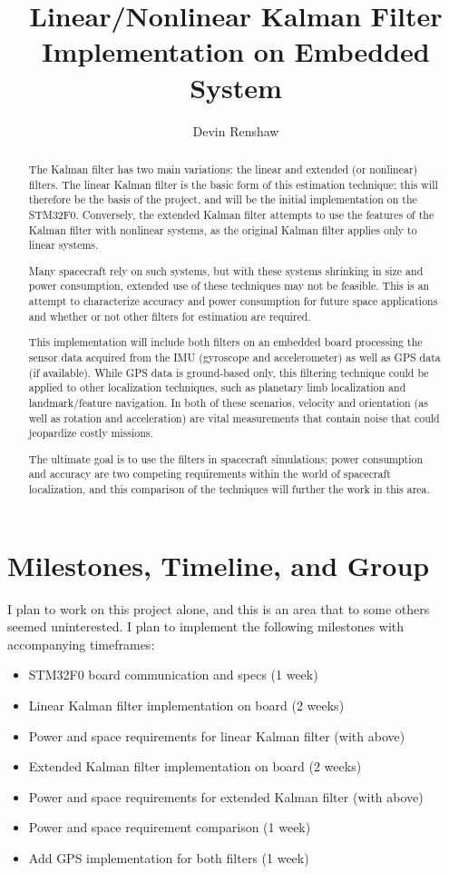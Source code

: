 \documentclass[12pt,letterpaper,openany,fleqn]{report}
\author{Devin Renshaw}
\title{Linear/Nonlinear Kalman Filter Implementation on Embedded System}
\begin{document}
	\maketitle
	\begin{abstract}
		The Kalman filter has two main variations: the linear and extended (or nonlinear) filters. The linear Kalman filter is the basic form of this estimation technique; this will therefore be the basis of the project, and will be the initial implementation on the STM32F0. Conversely, the extended Kalman filter attempts to use the features of the Kalman filter with nonlinear systems, as the original Kalman filter applies only to linear systems.
		
		Many spacecraft rely on such systems, but with these systems shrinking in size and power consumption, extended use of these techniques may not be feasible. This is an attempt to characterize accuracy and power consumption for future space applications and whether or not other filters for estimation are required.
		
		This implementation will include both filters on an embedded board processing the sensor data acquired from the IMU (gyroscope and accelerometer) as well as GPS data (if available). While GPS data is ground-based only, this filtering technique could be applied to other localization techniques, such as planetary limb localization and landmark/feature navigation. In both of these scenarios, velocity and orientation (as well as rotation and acceleration) are vital measurements that contain noise that could jeopardize costly missions.
		
		The ultimate goal is to use the filters in spacecraft simulations; power consumption and accuracy are two competing requirements within the world of spacecraft localization, and this comparison of the techniques will further the work in this area.
		
	\end{abstract}

	\chapter{Milestones, Timeline, and Group}
	I plan to work on this project alone, and this is an area that to some others seemed uninterested. I plan to implement the following milestones with accompanying timeframes:
	\begin{itemize}
		\item STM32F0 board communication and specs (1 week)
		\item Linear Kalman filter implementation on board (2 weeks)
		\item Power and space requirements for linear Kalman filter (with above)
		\item Extended Kalman filter implementation on board (2 weeks)
		\item Power and space requirements for extended Kalman filter (with above)
		\item Power and space requirement comparison (1 week)
		\item Add GPS implementation for both filters (1 week)
	\end{itemize}
\end{document}
